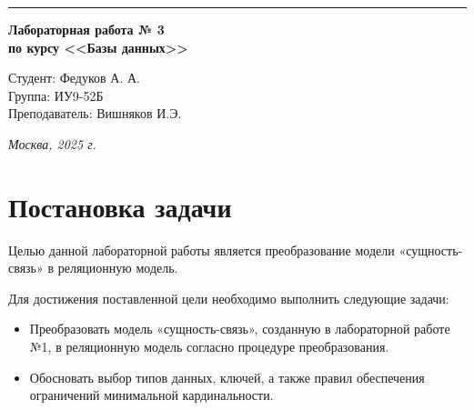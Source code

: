 \documentclass[a4paper, 14pt]{extarticle}
\begin{document}
\begin{titlepage}
\vspace*{-16pt}
\hspace{30pt}\rule{0.866\textwidth}{0.4pt}
  
\vspace{11em}

\begin{center}
\Large {\bf Лабораторная работа № 3} \\ 
\large {\bf по курсу <<Базы данных>>} \\

\end{center}\normalsize

\vspace{8em}


\begin{flushright}
 \begin{minipage}{0.5\linewidth}
      {Студент: Федуков А. А. \hspace*{15pt}\\ 
      Группа: ИУ9-52Б \\ 
      Преподаватель: Вишняков И.Э. \hspace*{15pt}}
  \end{minipage}
\end{flushright}
\bigskip
\vfill
\begin{center}
\textsl{Москва, 2025 г.}
\end{center}
\end{titlepage}

\renewcommand{\ttdefault}{pcr}

\setlength{\tabcolsep}{3pt}
\newpage
\setcounter{page}{2}

{
  \hypersetup{linkcolor=black}
  \tableofcontents
}


\section*{Постановка задачи}\label{Sect::goal}
Целью данной лабораторной работы является преобразование модели «сущность-связь» в реляционную модель.

Для достижения поставленной цели необходимо выполнить следующие задачи:
\begin{itemize}
    \item Преобразовать модель «сущность-связь», созданную в лабораторной работе №1, в реляционную модель согласно процедуре преобразования.
    \item Обосновать выбор типов данных, ключей, а также правил обеспечения ограничений минимальной кардинальности.
\end{itemize}
\end{document}
